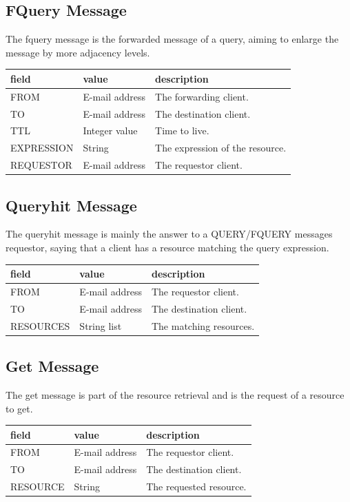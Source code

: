 \documentclass{article}
\begin{document}
\subsection{FQuery Message}
The fquery message is the forwarded message of a query, aiming to enlarge the
message by more adjacency levels.
\newline
\noindent
\begin{tabular}{|lll|} 
\hline
field & value & description \\
\hline 
FROM & E-mail address & The forwarding client. \\
TO & E-mail address & The destination client. \\
TTL & Integer value & Time to live. \\
EXPRESSION & String & The expression of the resource. \\
REQUESTOR & E-mail address & The requestor client. \\
\hline 
\end{tabular}

\subsection{Queryhit Message}
The queryhit message is mainly the answer to a QUERY/FQUERY messages requestor,
saying that a client has a resource matching the query expression.
\newline
\noindent
\begin{tabular}{|lll|} 
\hline
field & value & description \\
\hline 
FROM & E-mail address & The requestor client. \\
TO & E-mail address & The destination client. \\
RESOURCES & String list & The matching resources. \\
\hline 
\end{tabular}

\subsection{Get Message}
The get message is part of the resource retrieval and is the request of a
resource to get.
\newline
\noindent
\begin{tabular}{|lll|} 
\hline
field & value & description \\
\hline 
FROM & E-mail address & The requestor client. \\
TO & E-mail address & The destination client. \\
RESOURCE & String & The requested resource. \\
\hline 
\end{tabular}
\end{document}
